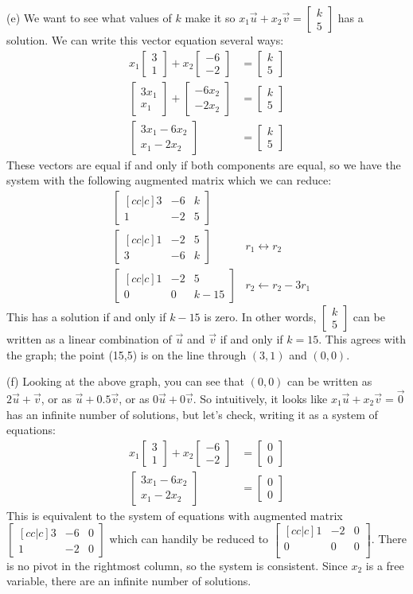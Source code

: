 \documentclass[11pt, letterpaper]{report}
\newenvironment{book}{}{}
\newcommand{\bbvec}[2]{
  \begin{bmatrix} #1 \\ #2 \end{bmatrix}
}
\begin{document}
\begin{book}
(e) We want to see what values of $k$ make it so $x_1\vec{u}+x_2\vec{v} = \bbvec{k}{5}$ has a solution. We can write this vector equation several ways:
\begin{align*}
x_1 \bbvec{3}{1} + x_2 \bbvec{-6}{-2} &= \bbvec{k}{5} \\
\bbvec{3x_1}{x_1} + \bbvec{-6x_2}{-2x_2} &= \bbvec{k}{5} \\
\bbvec{3x_1-6x_2}{x_1-2x_2} &= \bbvec{k}{5}
\end{align*}
These vectors are equal if and only if both components are equal, so we have the system with the following augmented matrix which we can reduce:
\begin{align*}
&\begin{bmatrix}[cc|c]
3 & -6 & k \\
1 & -2 & 5
\end{bmatrix} & \hspace{1pt} \\
&\begin{bmatrix}[cc|c]
1 & -2 & 5 \\
3 & -6 & k 
\end{bmatrix} &r_1 \leftrightarrow r_2 \\
&\begin{bmatrix}[cc|c]
1 & -2 & 5 \\
0 & 0 & k-15
\end{bmatrix} &r_2 \leftarrow r_2-3r_1
\end{align*}
This has a solution if and only if $k-15$ is zero. In other words, $\bbvec{k}{5}$ can be written as a linear combination of $\vec{u}$ and $\vec{v}$ if and only if $k=15$. This agrees with the graph; the point (15,5) is on the line through $(3,1)$ and $(0,0)$.

(f) Looking at the above graph, you can see that $(0,0)$ can be written as $2\vec{u}+\vec{v}$, or as $\vec{u}+0.5\vec{v}$, or as $0\vec{u}+0\vec{v}$. So intuitively, it looks like $x_1\vec{u}+x_2\vec{v}=\vec{0}$ has an infinite number of solutions, but let's check, writing it as a system of equations:
\begin{align*}
x_1 \bbvec{3}{1} + x_2 \bbvec{-6}{-2} &= \bbvec{0}{0} \\
\bbvec{3x_1-6x_2}{x_1-2x_2} &= \bbvec{0}{0} 
\end{align*}
This is equivalent to the system of equations with augmented matrix
$\begin{bmatrix} [cc|c]
3 & -6 & 0 \\
1 & -2 & 0
\end{bmatrix}$ which can handily be reduced to $\begin{bmatrix} [cc|c]
1 & -2 & 0 \\
0 & 0 & 0 \\
\end{bmatrix}$. There is no pivot in the rightmost column, so the system is consistent. Since $x_2$ is a free variable, there are an infinite number of solutions. \blacksquare

\end{book}
\end{document}
